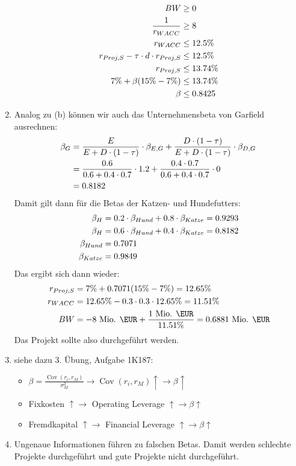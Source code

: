 \documentclass{article}
\DeclareMathOperator{\Cov}{Cov}
\begin{document}
\begin{enumerate}[label=(\alph*)]
		\begin{align}
			BW &\ge 0 \notag \\
			\frac{1}{r_{WACC}} &\ge 8 \notag \\
			r_{WACC} &\le 12.5\% \notag \\
			r_{Proj,S} - \tau\cdot d\cdot r_{Proj,S} &\le 12.5\% \notag \\
			r_{Proj,S} &\le 13.74\% \notag \\
			7\% + \beta(15\%-7\%) &\le 13.74\% \notag \\
			\beta &\le 0.8425 \notag
		\end{align}
		\item Analog zu (b) können wir auch das Unternehmensbeta von Garfield ausrechnen:
		\begin{align}
			\beta_G &= \frac{E}{E+D\cdot(1-\tau)}\cdot \beta_{E,G} + \frac{D\cdot (1-\tau)}{E+D\cdot (1-\tau)}\cdot\beta_{D,G} \notag \\
			&= \frac{0.6}{0.6 + 0.4\cdot 0.7}\cdot 1.2 + \frac{0.4\cdot 0.7}{0.6 + 0.4\cdot 0.7}\cdot 0 \notag \\
			&= 0.8182 \notag
		\end{align}
		Damit gilt dann für die Betas der Katzen- und Hundefutters:
		\begin{align}
			\beta_H &= 0.2\cdot\beta_{Hund} + 0.8\cdot\beta_{Katze} = 0.9293 \notag \\
			\beta_H &= 0.6\cdot\beta_{Hund} + 0.4\cdot\beta_{Katze} = 0.8182 \notag \\
			\beta_{Hund} &= 0.7071 \notag \\
			\beta_{Katze} &= 0.9849 \notag
		\end{align}
		Das ergibt sich dann wieder:
		\begin{align}
			r_{Proj,S} &= 7\% + 0.7071(15\%-7\%) = 12.65\% \notag \\
			r_{WACC} &= 12.65\% - 0.3\cdot 0.3\cdot 12.65\% = 11.51\% \notag \\
			BW &= -8\text{ Mio. \EUR} + \frac{1\text{ Mio. \EUR}}{11.51\%} = 0.6881\text{ Mio. \EUR} \notag
		\end{align}
		Das Projekt sollte also durchgeführt werden.
		\item siehe dazu 3. Übung, Aufgabe 1K187:
		\begin{itemize}
			\item $\beta = \frac{\Cov(r_i,r_M)}{\sigma_M^2} \to \Cov(r_i,r_M) \uparrow \to \beta \uparrow$
			\item Fixkosten $\uparrow\to$ Operating Leverage $\uparrow \to \beta\uparrow$
			\item Fremdkapital $\uparrow\to$ Financial Leverage $\uparrow\to\beta \uparrow$ 
		\end{itemize}
		\item Ungenaue Informationen führen zu falschen Betas. Damit werden schlechte Projekte durchgeführt und gute Projekte nicht durchgeführt.
	\end{enumerate}
	
\end{document}

